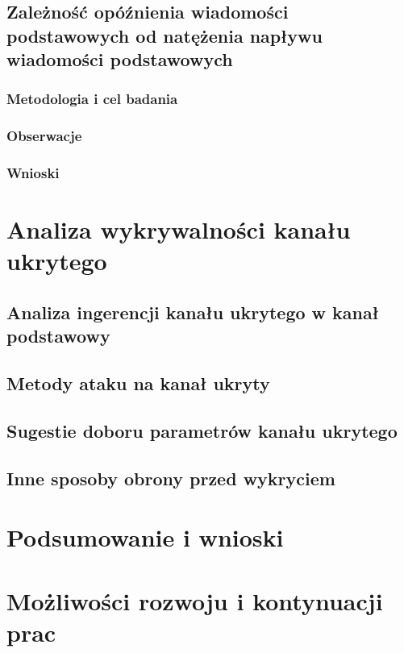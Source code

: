\documentclass[a4paper, twoside]{report}
\begin{document}
    \section{Zależność opóźnienia wiadomości podstawowych od natężenia napływu wiadomości podstawowych}
        \subsection{Metodologia i cel badania}
        \subsection{Obserwacje}
        \subsection{Wnioski}


\chapter{Analiza wykrywalności kanału ukrytego}
    \section{Analiza ingerencji kanału ukrytego w kanał podstawowy}
    \section{Metody ataku na kanał ukryty}
    \section{Sugestie doboru parametrów kanału ukrytego}
    \section{Inne sposoby obrony przed wykryciem}

\chapter{Podsumowanie i wnioski}
\chapter{Możliwości rozwoju i kontynuacji prac}

\clearpage
{}


\end{document}
